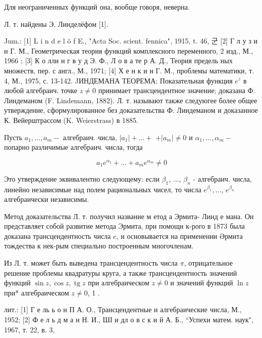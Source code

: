 \documentclass[10pt]{article}
\begin{document}
Для неограниченных функций она, вообще говоря, неверна.



Л. т. найдены Э. Линделёфом [1].



Jum.: [1] L i n d e l ö f E., "Acta Soc. scient. fennica", 1915, t. 46, 군 [2] Г л у з и н Г. М., Геометрическая теория функций комплексного переменного, 2 изд., М., 1966 ; [3] К о лли н г в у д Э. Ф., Л о в а те р А. Д., Теория предель ных множеств, пер. с англ., М., 1971; [4] Х е н к и н Г. М., проблемы математики, т. 4, М., 1975, с. 13-142. JИНДЕМАНА ТЕОРЕМА: Показательная функция $e^{z}$ в любой алгебраич. точке $z \neq 0$ принимает трансцендентное значение; доказана Ф. Линдеманом (F. Lindemann, 1882). Л. т. называют также следуюгее более общее утверждение, сформулированное без доказательства Ф. Линдеманом и доказанное К. Вейерштрассом (K. Weierstrass) в 1885.



Пусть $a_{1}, \ldots, a_{m}-$ алгебраич. числа, $\left|a_{1}\right|+\ldots+$ $+\left|a_{m}\right| \neq 0$ и $\alpha_{1}, \ldots, \alpha_{m}-$ попарно различимые алгебраич. числа, тогда



\[

a_{1} e^{\alpha_{1}}+\ldots+a_{m} e^{\alpha_{m}} \neq 0

\]



Это утверждение эквивалентно следующему: если $\beta_{1}$, ..., $\beta_{n}$ - алгебраич. числа, линейно независимые над полем рациональных чисел, то числа $e^{\beta_{1}}, \ldots$, $e^{\beta_{n}}$ алгебраически независимы.



Метод доказательства Л. т. получил название м етод а Эрмита- Линд е мана. Он представляет собой развитие метода Эрмита, при помощи к-рого в 1873 была доказана трансцендентность числа $e$, и основывается на применении Әрмита тождества к нек-рым специально построенным многочленам.



Из Л. т. может быть выведена трансцендентность числа $\pi$, отрицательное решение проблемы квадратуры круга, а также трансцендентность значений функций $\sin z, \cos z, \operatorname{tg} z$ при алгебраическом $z \neq 0$ и значений функций $\ln z$ при* алгебраическом $z \neq 0$, 1 .



лит.: [1] Г е ль ь о н П А. О., Трансцендентные и алгебраические числа, М., 1952; [2] Ф е л ь д м а н Н. И., ШІ и дл о в с к и й А. Б., “Успехи матем. наук", 1967, т. 22, в. 3,
\end{document}

